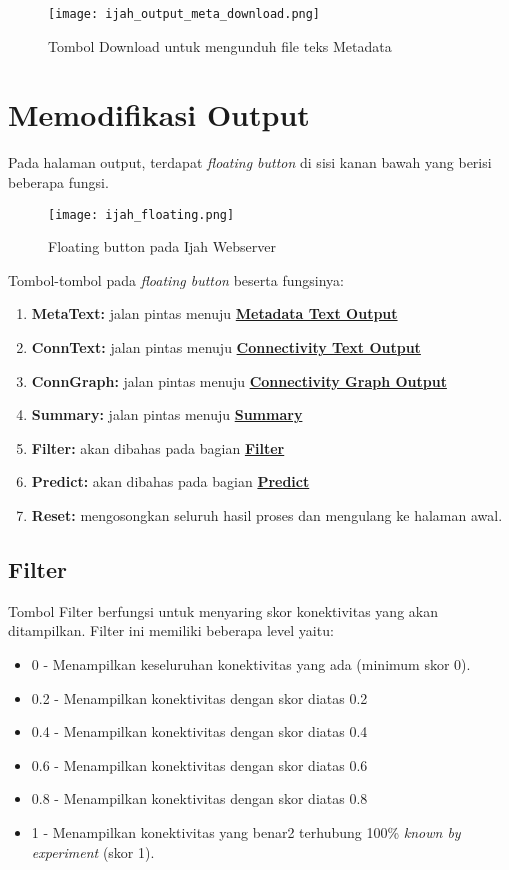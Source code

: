 	\begin{figure}[H]
	\centering
	\texttt{[image: ijah\_output\_meta\_download.png]}
	\caption{Tombol Download untuk mengunduh file teks Metadata}
	\label{fig:ijah_output_meta_download}
	\end{figure}


\section{Memodifikasi Output}
Pada halaman output, terdapat \emph{floating button} di sisi kanan bawah yang berisi beberapa fungsi.

	\begin{figure}[H]
	\centering
	\texttt{[image: ijah\_floating.png]}
	\caption{Floating button pada Ijah Webserver}
	\label{fig:ijah_floating}
	\end{figure}

Tombol-tombol pada \emph{floating button} beserta fungsinya:
\begin{enumerate}
\item \textbf{MetaText:} jalan pintas menuju \hyperref[meta]{\textbf{Metadata Text Output}}
\item \textbf{ConnText:} jalan pintas menuju \hyperref[text]{\textbf{Connectivity Text Output}}
\item \textbf{ConnGraph:} jalan pintas menuju \hyperref[graph]{\textbf{Connectivity Graph Output}}
\item \textbf{Summary:} jalan pintas menuju \hyperref[summary]{\textbf{Summary}}
\item \textbf{Filter:} akan dibahas pada bagian \hyperref[filter]{\textbf{Filter}}
\item \textbf{Predict:} akan dibahas pada bagian \hyperref[predictmore]{\textbf{Predict}}
\item \textbf{Reset:} mengosongkan seluruh hasil proses dan mengulang ke halaman awal.
\end{enumerate}

	\subsection{Filter} \label{filter}
	Tombol Filter berfungsi untuk menyaring skor konektivitas yang akan ditampilkan. Filter ini memiliki beberapa level yaitu:
	\begin{itemize}
	\item 0 - Menampilkan keseluruhan konektivitas yang ada (minimum skor 0).
	\item 0.2 - Menampilkan konektivitas dengan skor diatas 0.2
	\item 0.4 - Menampilkan konektivitas dengan skor diatas 0.4
	\item 0.6 - Menampilkan konektivitas dengan skor diatas 0.6
	\item 0.8 - Menampilkan konektivitas dengan skor diatas 0.8
	\item 1 - Menampilkan konektivitas yang benar2 terhubung 100\% \emph{known by experiment} (skor 1).
	\end{itemize}

